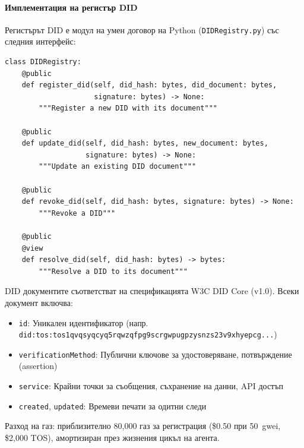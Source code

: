 \documentclass[11pt]{article}
\begin{document}
\paragraph{Имплементация на регистър DID} Регистърът DID е модул на умен договор на Python (\texttt{DIDRegistry.py}) със следния интерфейс:
\begin{verbatim}
class DIDRegistry:
    @public
    def register_did(self, did_hash: bytes, did_document: bytes,
                     signature: bytes) -> None:
        """Register a new DID with its document"""

    @public
    def update_did(self, did_hash: bytes, new_document: bytes,
                   signature: bytes) -> None:
        """Update an existing DID document"""

    @public
    def revoke_did(self, did_hash: bytes, signature: bytes) -> None:
        """Revoke a DID"""

    @public
    @view
    def resolve_did(self, did_hash: bytes) -> bytes:
        """Resolve a DID to its document"""
\end{verbatim}
DID документите съответстват на спецификацията W3C DID Core (v1.0). Всеки документ включва:
\begin{itemize}[noitemsep]
  \item \texttt{id}: Уникален идентификатор (напр. \texttt{did:tos:tos1qvqsyqcyq5rqwzqfpg9scrgwpugpzysnzs23v9xhyepcg...})
  \item \texttt{verificationMethod}: Публични ключове за удостоверяване, потвърждение (assertion)
  \item \texttt{service}: Крайни точки за съобщения, съхранение на данни, API достъп
  \item \texttt{created}, \texttt{updated}: Времеви печати за одитни следи
\end{itemize}
Разход на газ: приблизително 80,000 газ за регистрация (\$0.50 при 50~gwei, \$2,000 TOS), амортизиран през жизнения цикъл на агента.
\end{document}
